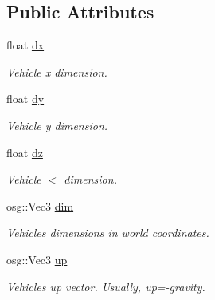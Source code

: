 \subsection*{Public Attributes}
\begin{DoxyCompactItemize}
\item 
\mbox{\label{classbtosgVehicle_aed23010bba3c34158abd4548328b3819}} 
float \hyperlink{classbtosgVehicle_aed23010bba3c34158abd4548328b3819}{dx}
\begin{DoxyCompactList}\small\item\em Vehicle x dimension. \end{DoxyCompactList}\item 
\mbox{\label{classbtosgVehicle_ae124e1cd8c424080d7be7c47edb07eb1}} 
float \hyperlink{classbtosgVehicle_ae124e1cd8c424080d7be7c47edb07eb1}{dy}
\begin{DoxyCompactList}\small\item\em Vehicle y dimension. \end{DoxyCompactList}\item 
\mbox{\label{classbtosgVehicle_a39857392dc4882886964c1beefa46268}} 
float \hyperlink{classbtosgVehicle_a39857392dc4882886964c1beefa46268}{dz}
\begin{DoxyCompactList}\small\item\em Vehicle $<$ dimension. \end{DoxyCompactList}\item 
\mbox{\label{classbtosgVehicle_afed9fb742c4a8ed58e8d6202dfc20344}} 
osg\+::\+Vec3 \hyperlink{classbtosgVehicle_afed9fb742c4a8ed58e8d6202dfc20344}{dim}
\begin{DoxyCompactList}\small\item\em Vehicle\textquotesingle{}s dimensions in world coordinates. \end{DoxyCompactList}\item 
\mbox{\label{classbtosgVehicle_a8f68a9e001e79f61602427228c97fe26}} 
osg\+::\+Vec3 \hyperlink{classbtosgVehicle_a8f68a9e001e79f61602427228c97fe26}{up}
\begin{DoxyCompactList}\small\item\em Vehicle\textquotesingle{}s up vector. Usually, up=-\/gravity. \end{DoxyCompactList}\item 

\end{DoxyCompactItemize}

